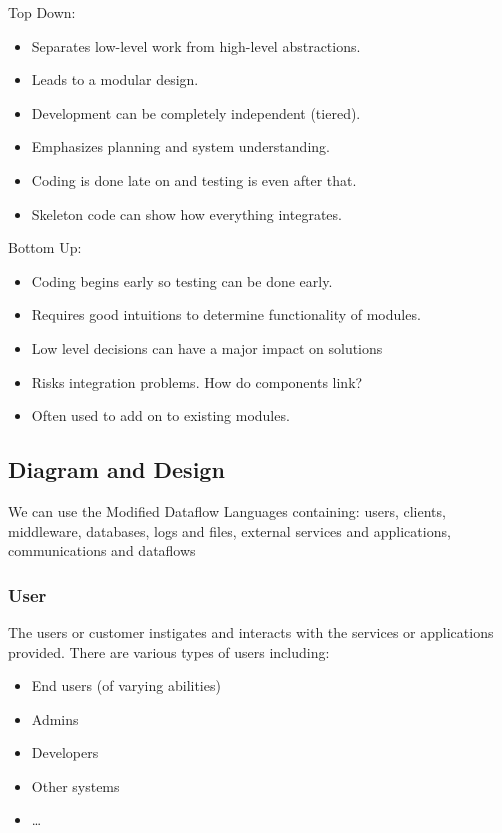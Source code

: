 \begin{minipage}[t]{0.45\linewidth}
    Top Down:
    \begin{itemize}
        \item Separates low-level work from high-level abstractions.
        \item Leads to a modular design.
        \item Development can be completely independent (tiered).
        \item Emphasizes planning and system understanding.
        \item Coding is done late on and testing is even after that.
        \item Skeleton code can show how everything integrates.
    \end{itemize}
\end{minipage}
\hfill
\begin{minipage}[t]{0.45\linewidth}
    Bottom Up:
    \begin{itemize}
        \item Coding begins early so testing can be done early.
        \item Requires good intuitions to determine functionality of modules.
        \item Low level decisions can have a major impact on solutions
        \item Risks integration problems. How do components link?
        \item Often used to add on to existing modules.
    \end{itemize}
\end{minipage}

\subsection{Diagram and Design}\label{sub:diagram_and_design}

We can use the Modified Dataflow Languages containing: users, clients, middleware, databases, logs and files, external services and applications, communications and dataflows

\subsubsection{User}\label{ssub:user}

The users or customer instigates and interacts with the services or applications provided.
There are various types of users including:
\begin{itemize}
    \item End users (of varying abilities)
    \item Admins
    \item Developers
    \item Other systems
    \item \dots
\end{itemize}


